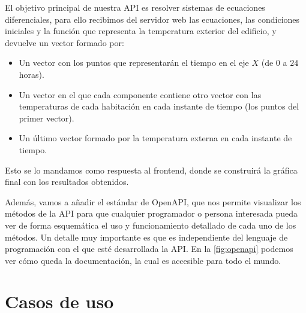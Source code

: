 El objetivo principal de nuestra API es resolver sistemas de ecuaciones diferenciales, para ello recibimos del servidor web las ecuaciones, las condiciones iniciales y la función que representa la temperatura exterior del edificio, y devuelve un vector formado por:
\begin{itemize}
	\item Un vector con los puntos que representarán el tiempo en el eje $X$ (de $0$ a $24$ horas).
	\item Un vector en el que cada componente contiene otro vector con las temperaturas de cada habitación en cada instante de tiempo (los puntos del primer vector).
	\item Un último vector formado por la temperatura externa en cada instante de tiempo.
\end{itemize} 
Esto se lo mandamos como respuesta al frontend, donde se construirá la gráfica final con los resultados obtenidos.

Además, vamos a añadir el estándar de OpenAPI, que nos permite visualizar los métodos de la API para que cualquier programador o persona interesada pueda ver de forma esquemática el uso y funcionamiento detallado de cada uno de los métodos. Un detalle muy importante es que es independiente del lenguaje de programación con el que esté desarrollada la API. En la \autoref{fig:openapi} podemos ver cómo queda la documentación, la cual es accesible para todo el mundo.

\section{Casos de uso}
